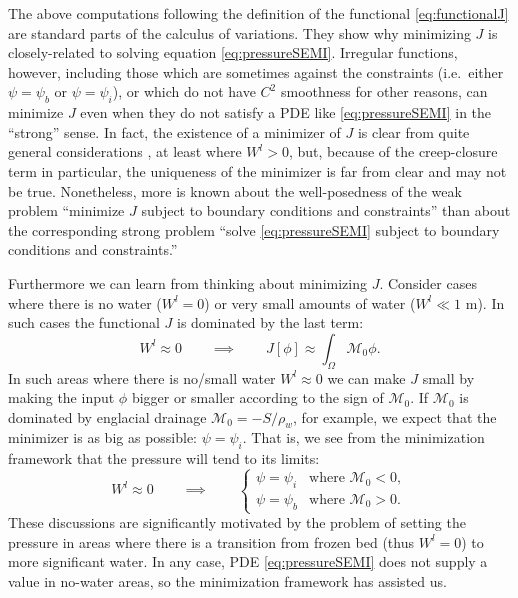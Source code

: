\documentclass[11pt]{amsart}
\begin{document}
The above computations following the definition of the functional \eqref{eq:functionalJ} are standard parts of the calculus of variations.  They show why minimizing $J$ is  closely-related to solving equation \eqref{eq:pressureSEMI}.  Irregular functions, however, including those which are sometimes against the constraints (i.e.~either $\psi=\psi_b$ or $\psi=\psi_i$), or which do not have $C^2$ smoothness for other reasons, can minimize $J$ even when they do not satisfy a PDE like  \eqref{eq:pressureSEMI} in the ``strong'' sense.  In fact, the existence of a minimizer of $J$ is clear from quite general considerations \cite[chapter 8]{Evans}, at least where $W^l>0$, but, because of the creep-closure term in particular, the uniqueness of the minimizer is far from clear and may not be true.  Nonetheless, more is known about the well-posedness of the weak problem ``minimize $J$ subject to boundary conditions and constraints'' than about the corresponding strong problem ``solve \eqref{eq:pressureSEMI} subject to boundary conditions and constraints.''

Furthermore we can learn from thinking about minimizing $J$.   Consider cases where there is no water ($W^l=0$) or very small amounts of water ($W^l \ll 1$ m).  In such cases the functional $J$ is dominated by the last term:
	$$W^l \approx 0 \qquad \implies \qquad J[\phi] \approx \int_\Omega \mathcal{M}_0 \phi.$$
In such areas where there is no/small water $W^l \approx 0$ we can make $J$ small by making the input $\phi$ bigger or smaller according to the sign of $\mathcal{M}_0$.  If $\mathcal{M}_0$ is dominated by englacial drainage $\mathcal{M}_0=-S/\rho_w$, for example, we expect that the minimizer is as big as possible: $\psi=\psi_i$.  That is, we see from the minimization framework that the pressure will tend to its limits:
	$$W^l \approx 0 \qquad \implies \qquad \begin{cases} \psi=\psi_i & \text{where } \mathcal{M}_0 < 0, \\ \psi=\psi_b & \text{where } \mathcal{M}_0 > 0.\end{cases}$$
These discussions are significantly motivated by the problem of setting the pressure in areas where there is a transition from frozen bed (thus $W^l=0$) to more significant water.  In any case, PDE \eqref{eq:pressureSEMI} does not supply a value in no-water areas, so the minimization framework has assisted us.
\end{document}
